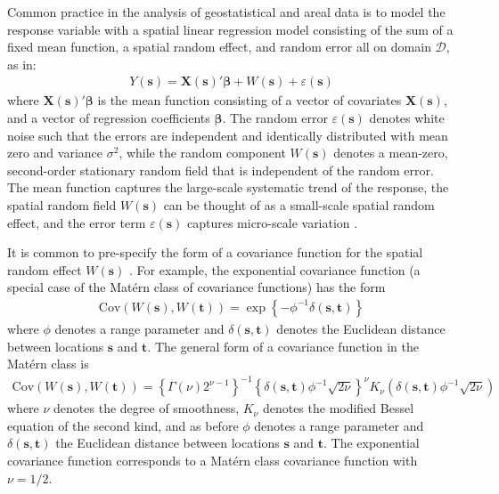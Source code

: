 \documentclass[authoryear, review, 11pt]{elsarticle}
\begin{document}
	 Common practice in the analysis of geostatistical and areal data is to model the response variable with a spatial linear regression model consisting of the sum of a fixed mean function, a spatial random effect, and random error all on domain $\mathcal{D}$, as in: 
\begin{align}\label{eq:spatial-regression}
    Y(\bm{s}) = \bm{X}(\bm{s})'\bm{\beta} + W(\bm{s}) + \varepsilon(\bm{s})
\end{align}
where $\bm{X}(\bm{s})'\bm{\beta}$ is the mean function consisting of a vector of covariates $\bm{X}(\bm{s})$, and a vector of regression coefficients $\bm{\beta}$. The random error $\varepsilon(\bm{s})$ denotes white noise such that the errors are independent and identically distributed with mean zero and variance $\sigma^2$, while the random component $W(\bm{s})$ denotes a mean-zero, second-order stationary random field that is independent of the random error. The mean function captures the large-scale systematic trend of the response, the spatial random field $W(\bm{s})$ can be thought of as a small-scale spatial random effect, and the error term $\varepsilon(\bm{s})$ captures micro-scale variation \citep{Cressie:1993}.

It is common to pre-specify the form of a covariance function for the spatial random effect $W(\bm{s})$ \citep{Diggle:2007}. For example, the exponential covariance function (a special case of the Mat\'{e}rn class of covariance functions) has the form
\begin{align}\label{eq:exponential-covariance}
    \text{Cov}(W(\bm{s}), W(\bm{t})) = \exp\left\{-\phi^{-1} \delta(\bm{s}, \bm{t}) \right\}
\end{align}
where $\phi$ denotes a range parameter and $\delta(\bm{s}, \bm{t})$ denotes the Euclidean distance between locations $\bm{s}$ and $\bm{t}$. The general form of a covariance function in the Mat\'{e}rn class is
\begin{align}\label{eq:matern-covarinace}
    \text{Cov}(W(\bm{s}), W(\bm{t})) = \left\{\Gamma(\nu) 2^{\nu-1} \right\}^{-1} \left\{\delta(\bm{s}, \bm{t}) \phi^{-1}\sqrt{2\nu}\right\}^\nu K_{\nu} \left(\delta(\bm{s}, \bm{t}) \phi^{-1}\sqrt{2\nu}\right)
    \end{align}
where $\nu$ denotes the degree of smoothness, $K_{\nu}$ denotes the modified Bessel equation of the second kind, and as before $\phi$ denotes a range parameter and $\delta(\bm{s}, \bm{t})$ the Euclidean distance between locations $\bm{s}$ and $\bm{t}$. The exponential covariance function corresponds to a Mat\'{e}rn class covariance function with $\nu = 1/2$.
\end{document}
